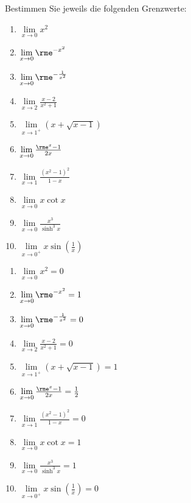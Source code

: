 \documentclass[11pt,answers]{exam}
\begin{document}
\begin{questions}

Bestimmen Sie jeweils die folgenden Grenzwerte:\\
\parbox{0.5\textwidth}{\begin{enumerate}
\item $\lim\limits_{x\to 0} x^2$
\item $\lim\limits_{x\to 0} \rme^{-x^2}$
\item $\lim\limits_{x\to 0} \rme^{-\frac{1}{x^2}}$
\item $\lim\limits_{x\to 2} \frac{x-2}{x^2+1}$
\item $\lim\limits_{x\to 1^+} \left(x+\sqrt{x-1}\right)$
\end{enumerate}}\parbox{0.5\textwidth}{\begin{enumerate}\setcounter{enumi}{5}
\item $\lim\limits_{x\to 0} \frac{\rme^x-1}{2x}$
\item $\lim\limits_{x\to 1} \frac{(x^2-1)^2}{1-x}$
\item $\lim\limits_{x\to 0} x\cot x$
\item $\lim\limits_{x\to 0} \frac{x^3}{\sinh^3 x}$
\item $\lim\limits_{x\to 0^+} x\sin\left(\frac{1}{x}\right)$
\end{enumerate}}
\begin{solution}
\begin{enumerate}
\item $\lim\limits_{x\to 0} x^2=0$
\item $\lim\limits_{x\to 0} \rme^{-x^2}=1$
\item $\lim\limits_{x\to 0} \rme^{-\frac{1}{x^2}}=0$
\item $\lim\limits_{x\to 2} \frac{x-2}{x^2+1}=0$
\item $\lim\limits_{x\to 1^+} \left(x+\sqrt{x-1}\right)=1$
\item $\lim\limits_{x\to 0} \frac{\rme^x-1}{2x}=\frac{1}{2}$
\item $\lim\limits_{x\to 1} \frac{(x^2-1)^2}{1-x}=0$
\item $\lim\limits_{x\to 0} x\cot x=1$
\item $\lim\limits_{x\to 0} \frac{x^3}{\sinh^3 x}=1$
\item $\lim\limits_{x\to 0^+} x\sin\left(\frac{1}{x}\right)=0$
\end{enumerate}
\end{solution}





\end{questions}
\end{document}
